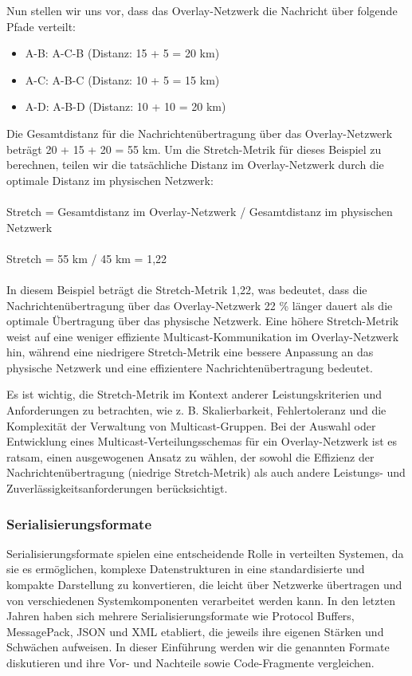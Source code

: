 Nun stellen wir uns vor, dass das Overlay-Netzwerk die Nachricht über folgende Pfade verteilt:
\begin{itemize} 
\item A-B: A-C-B (Distanz: 15 + 5 = 20 km)
\item A-C: A-B-C (Distanz: 10 + 5 = 15 km)
\item A-D: A-B-D (Distanz: 10 + 10 = 20 km)
\end{itemize} 
Die Gesamtdistanz für die Nachrichtenübertragung über das Overlay-Netzwerk beträgt 20 + 15 + 20 = 55 km. Um die Stretch-Metrik für dieses Beispiel zu berechnen, teilen wir die tatsächliche Distanz im Overlay-Netzwerk durch die optimale Distanz im physischen Netzwerk:
\\\\
Stretch = Gesamtdistanz im Overlay-Netzwerk / Gesamtdistanz im physischen Netzwerk
\\\\
Stretch = 55 km / 45 km = 1,22
\\\\
In diesem Beispiel beträgt die Stretch-Metrik 1,22, was bedeutet, dass die Nachrichtenübertragung über das Overlay-Netzwerk 22 \% länger dauert als die optimale Übertragung über das physische Netzwerk. Eine höhere Stretch-Metrik weist auf eine weniger effiziente Multicast-Kommunikation im Overlay-Netzwerk hin, während eine niedrigere Stretch-Metrik eine bessere Anpassung an das physische Netzwerk und eine effizientere Nachrichtenübertragung bedeutet.

Es ist wichtig, die Stretch-Metrik im Kontext anderer Leistungskriterien und Anforderungen zu betrachten, wie z. B. Skalierbarkeit, Fehlertoleranz und die Komplexität der Verwaltung von Multicast-Gruppen. Bei der Auswahl oder Entwicklung eines Multicast-Verteilungsschemas für ein Overlay-Netzwerk ist es ratsam, einen ausgewogenen Ansatz zu wählen, der sowohl die Effizienz der Nachrichtenübertragung (niedrige Stretch-Metrik) als auch andere Leistungs- und Zuverlässigkeitsanforderungen berücksichtigt.

\subsubsection{Serialisierungsformate}

Serialisierungsformate spielen eine entscheidende Rolle in verteilten Systemen, da sie es ermöglichen, komplexe Datenstrukturen in eine standardisierte und kompakte Darstellung zu konvertieren, die leicht über Netzwerke übertragen und von verschiedenen Systemkomponenten verarbeitet werden kann. In den letzten Jahren haben sich mehrere Serialisierungsformate wie Protocol Buffers, MessagePack, JSON und XML etabliert, die jeweils ihre eigenen Stärken und Schwächen aufweisen. In dieser Einführung werden wir die genannten Formate diskutieren und ihre Vor- und Nachteile sowie Code-Fragmente vergleichen.

